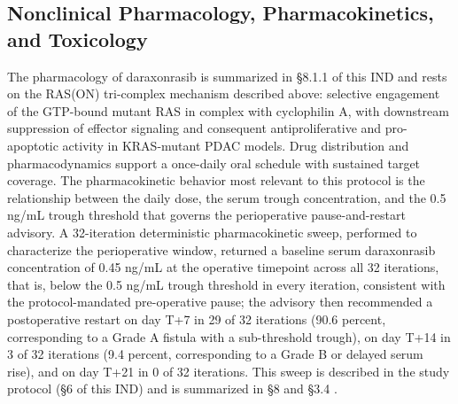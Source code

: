 \subsection*{Nonclinical Pharmacology, Pharmacokinetics, and Toxicology}

The pharmacology of daraxonrasib is summarized in \S 8.1.1 of this IND and rests on
the RAS(ON) tri-complex mechanism described above: selective engagement of the
GTP-bound mutant RAS in complex with cyclophilin A, with downstream suppression of
effector signaling and consequent antiproliferative and pro-apoptotic activity in
KRAS-mutant PDAC models. Drug distribution and pharmacodynamics support a
once-daily oral schedule with sustained target coverage. The pharmacokinetic
behavior most relevant to this protocol is the relationship between the daily dose,
the serum trough concentration, and the 0.5 ng/mL trough threshold that governs the
perioperative pause-and-restart advisory. A 32-iteration deterministic
pharmacokinetic sweep, performed to characterize the perioperative window,
returned a baseline serum daraxonrasib concentration of 0.45 ng/mL at the operative
timepoint across all 32 iterations, that is, below the 0.5 ng/mL trough threshold
in every iteration, consistent with the protocol-mandated pre-operative pause; the
advisory then recommended a postoperative restart on day T+7 in 29 of 32 iterations
(90.6 percent, corresponding to a Grade A fistula with a sub-threshold trough),
on day T+14 in 3 of 32 iterations (9.4 percent, corresponding to a Grade B or
delayed serum rise), and on day T+21 in 0 of 32 iterations. This sweep is
described in the study protocol (\S 6 of this IND) and is summarized in \S 8 and
\S 3.4 \cite{qspmetpancre,fdadigtwinpc,pdacdigtwinp}.

